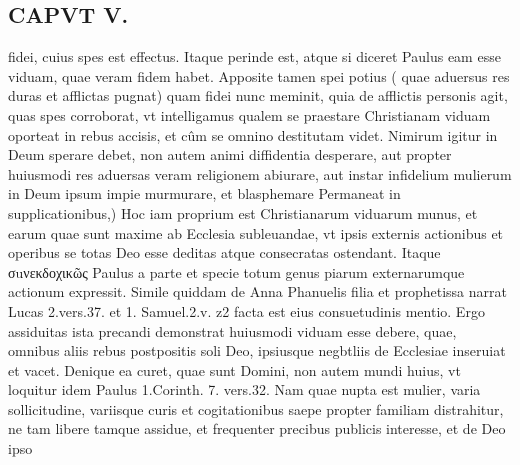 \documentclass{article}
\begin{document}
\begin{pages}
\section*{CAPVT  V. }
\marginpar{[ p.29 ]}\pstart fidei, cuius spes est effectus. Itaque perinde est, atque si diceret Paulus eam esse viduam, quae veram fidem habet. Apposite tamen spei potius ( quae aduersus res duras et afflictas pugnat) quam fidei nunc meminit, quia de afflictis personis agit, quas spes corroborat, vt intelligamus qualem se praestare Christianam viduam oporteat in rebus accisis, et cûm se omnino destitutam videt. Nimirum igitur in Deum sperare debet, non autem animi diffidentia desperare, aut propter huiusmodi res aduersas veram religionem abiurare, aut instar infidelium mulierum in Deum ipsum impie murmurare, et blasphemare Permaneat in supplicationibus,) Hoc iam proprium est Christianarum viduarum munus, et earum quae sunt maxime ab Ecclesia subleuandae, vt ipsis externis actionibus et operibus se totas Deo esse deditas atque consecratas ostendant. Itaque σuνεκδοχικῶς Paulus a parte et specie totum genus piarum externarumque actionum expressit. Simile quiddam de Anna Phanuelis filia et prophetissa narrat Lucas 2.vers.37. et 1. Samuel.2.v. z2 facta est eius consuetudinis mentio. Ergo assiduitas ista precandi demonstrat huiusmodi viduam esse debere, quae, omnibus aliis rebus postpositis soli Deo, ipsiusque negbtliis de Ecclesiae inseruiat et vacet. Denique ea curet, quae sunt Domini, non autem mundi huius, vt loquitur idem Paulus 1.Corinth. 7. vers.32. Nam quae nupta est mulier, varia sollicitudine, variisque curis et cogitationibus saepe propter familiam distrahitur, ne tam libere tamque assidue, et frequenter precibus publicis interesse, et de Deo ipso  \pend

\end{pages}
\end{document}

